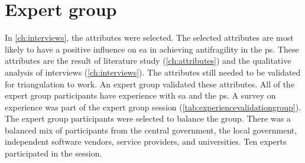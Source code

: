 \chapter{Expert group}
\label{ch:expertgroup}
\setcounter{footnote}{0}
In \cref{ch:interviews}, the \glspl{attribute} were selected. The selected \glspl{attribute} are most likely to have a positive influence on \acrshort{ea} in achieving \gls{antifragility} in the \gls{ps}. These attributes are the result of literature study (\cref{ch:attributes}) and the qualitative analysis of interviews (\cref{ch:interviews}). The \glspl{attribute} still needed to be validated for \gls{triangulation} to work. An expert group validated these \glspl{attribute}. All of the expert group participants have experience with \acrshort{ea} and the \gls{ps}. A survey on experience was part of the expert group session (\cref{tab:experiencevalidationgroup}). The expert group participants were selected to balance the group. There was a balanced mix of participants from the central government, the local government, independent software vendors, service providers, and universities. Ten experts participated in the session.

